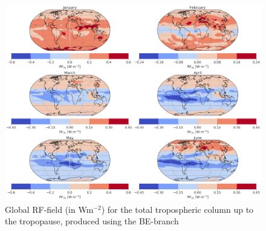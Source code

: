 
\begin{figure}[ht]
    \centering
    \includegraphics[width = \linewidth]{Chapter6_Results/images/RF/BE_RF_global_2001.png}
    \caption{Global RF-field (in Wm$^{-2}$) for the total tropospheric column up to the tropopause, produced using the BE-branch}
    \label{fig:BE_RF_global_2001}
\end{figure}